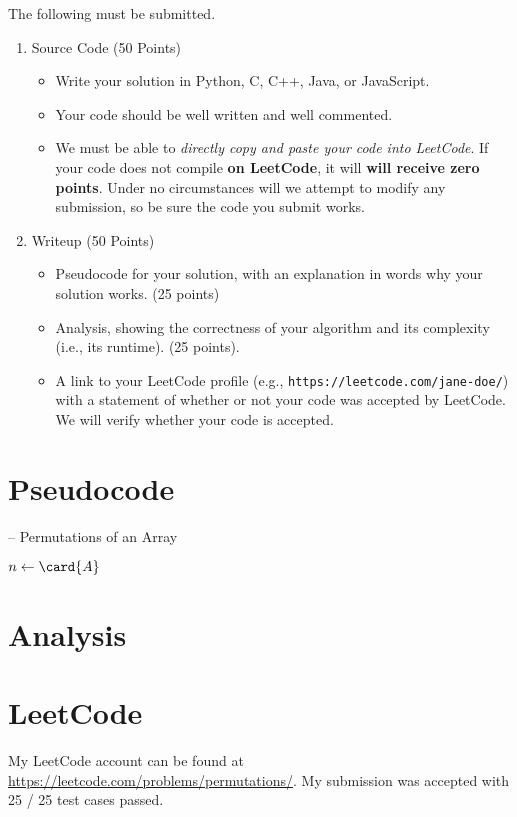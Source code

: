 \documentclass[final]{article}
\begin{document}
\begin{titlepage}
    The following must be submitted.
    \begin{enumerate}[label=\textbf{(\alph*)}]
        \item Source Code (50 Points)
              \begin{itemize}
                  \item Write your solution in Python, C, C++, Java, or JavaScript.
                  \item Your code should be well written and well commented.
                  \item We must be able to \emph{directly copy and paste your code into LeetCode}. If your code does not compile \textbf{on LeetCode}, it will \textbf{will receive zero points}. Under no circumstances will we attempt to modify any submission, so be sure the code you submit works.
              \end{itemize}
        \item Writeup (50 Points)
              \begin{itemize}
                  \item Pseudocode for your solution, with an explanation in words why your solution works. (25 points)
                  \item Analysis, showing the correctness of your algorithm and its  complexity (i.e., its runtime). (25 points).
                  \item A link to your LeetCode profile (e.g., \texttt{https://leetcode.com/jane-doe/}) with a statement of whether or not your code was accepted by LeetCode. We will verify whether your code is accepted.
              \end{itemize}
    \end{enumerate}
\end{titlepage}

\section{Pseudocode}
\begin{algorithm}[H]
    \caption[]{ -- Permutations of an Array }
    \label{alg:permutations}
    \begin{algorithmic}[1]
        \State $n\gets\card{A}$
        \Else {}
        \EndIf
        \EndFunction
    \end{algorithmic}
\end{algorithm}
\section{Analysis}

\section{LeetCode}
My LeetCode account can be found at \url{https://leetcode.com/problems/permutations/}. My submission was accepted with 25 / 25 test cases passed.
\end{document}
